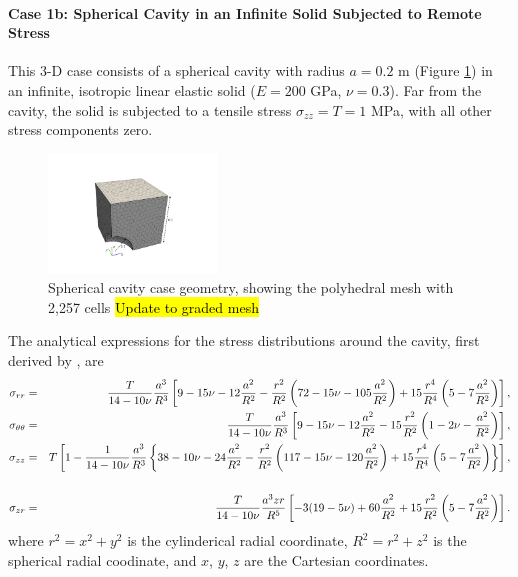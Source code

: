 \documentclass[sn-mathphys,Numbered]{sn-jnl}%
\begin{document}
\paragraph{Case 1b: Spherical Cavity in an Infinite Solid Subjected to Remote Stress}
This 3-D case consists of a spherical cavity with radius $a = 0.2$ m (Figure \ref{fig:spherical_cavity}) in an infinite, isotropic linear elastic solid ($E = 200$ GPa, $\nu = 0.3$).
Far from the cavity, the solid is subjected to a tensile stress $\sigma_{zz} = T = 1$ MPa, with all other stress components zero.
\begin{figure}[htbp]
   \centering
   \includegraphics[width=0.4\textwidth]{figures/spherical_cavity.pdf} 
   \caption{Spherical cavity case geometry, showing the polyhedral mesh with 2,257 cells \hl{Update to graded mesh}}
   \label{fig:spherical_cavity}
\end{figure}
The analytical expressions for the stress distributions around the cavity, first derived by \cite{Southwell1926}, are
\begin{eqnarray}
	\sigma_{rr} &=&
		\frac{T}{14 - 10\nu} \frac{a^3}{R^3}
		\left[ 9 - 15\nu - 12 \frac{a^2}{R^2}  - \frac{r^2}{R^2} \left( 72 - 15\nu - 105 \frac{a^2}{R^2} \right) + 15 \frac{r^4}{R^4} \left( 5 - 7 \frac{a^2}{R^2} \right) \right], \\
	\sigma_{\theta\theta} &=&
		\frac{T}{14 - 10\nu} \frac{a^3}{R^3}
		\left[ 9 - 15\nu - 12 \frac{a^2}{R^2}  - 15 \frac{r^2}{R^2} \left( 1 - 2\nu - \frac{a^2}{R^2} \right) \right], \\
	\sigma_{zz} &=&
		T \left[ 1 - \frac{1}{14 - 10\nu} \frac{a^3}{R^3} \left\{ 38 - 10\nu - 24 \frac{a^2}{R^2} 
		- \frac{r^2}{R^2} \left( 117 - 15\nu - 120 \frac{a^2}{R^2} \right)
		+ 15 \frac{r^4}{R^4} \left( 5 - 7 \frac{a^2}{R^2} \right) \right\} \right], \notag \\
		\\
	\sigma_{zr} &=&
	\frac{T}{14 - 10\nu} \frac{a^3 z r}{R^5}
	\left[ -3(19 - 5\nu) + 60 \frac{a^2}{R^2} + 15 \frac{r^2}{R^2} \left( 5 - 7 \frac{a^2}{R^2} \right)  \right].
\end{eqnarray}
where $r^2 = x^2 + y^2$ is the cylinderical radial coordinate, $R^2 = r^2 + z^2$ is the spherical radial coodinate, and $x$, $y$, $z$ are the Cartesian coordinates.
\end{document}
